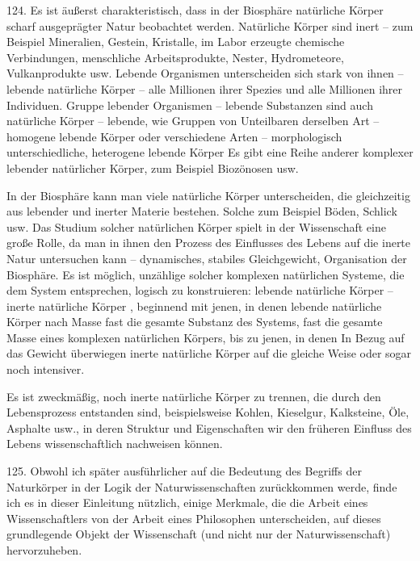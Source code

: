 \documentclass[11pt,a4paper]{book}
\begin{document}
124. Es ist äußerst charakteristisch, dass in der Biosphäre natürliche Körper scharf ausgeprägter Natur beobachtet werden. Natürliche Körper sind inert -- zum Beispiel Mineralien, Gestein, Kristalle, im Labor erzeugte chemische Verbindungen, menschliche Arbeitsprodukte, Nester, Hydrometeore, Vulkanprodukte usw. Lebende Organismen unterscheiden sich stark von ihnen -- lebende natürliche Körper -- alle Millionen ihrer Spezies und alle Millionen ihrer Individuen. Gruppe lebender Organismen -- lebende Substanzen sind auch natürliche Körper -- lebende, wie Gruppen von Unteilbaren derselben Art -- homogene lebende Körper oder verschiedene Arten -- morphologisch unterschiedliche, heterogene lebende Körper Es gibt eine Reihe anderer komplexer lebender natürlicher Körper, zum Beispiel Biozönosen usw.



In der Biosphäre kann man viele natürliche Körper unterscheiden, die gleichzeitig aus lebender und inerter Materie bestehen. Solche zum Beispiel Böden, Schlick usw. Das Studium solcher natürlichen Körper spielt in der Wissenschaft eine große Rolle, da man in ihnen den Prozess des Einflusses des Lebens auf die inerte Natur untersuchen kann -- dynamisches, stabiles Gleichgewicht, Organisation der Biosphäre. Es ist möglich, unzählige solcher komplexen natürlichen Systeme, die dem System entsprechen, logisch zu konstruieren: lebende natürliche Körper -- inerte natürliche Körper , beginnend mit jenen, in denen lebende natürliche Körper nach Masse fast die gesamte Substanz des Systems, fast die gesamte Masse eines komplexen natürlichen Körpers, bis zu jenen, in denen In Bezug auf das Gewicht überwiegen inerte natürliche Körper auf die gleiche Weise oder sogar noch intensiver.



Es ist zweckmäßig, noch inerte natürliche Körper zu trennen, die durch den Lebensprozess entstanden sind, beispielsweise Kohlen, Kieselgur, Kalksteine, Öle, Asphalte usw., in deren Struktur und Eigenschaften wir den früheren Einfluss des Lebens wissenschaftlich nachweisen können.



125. Obwohl ich später ausführlicher auf die Bedeutung des Begriffs der Naturkörper in der Logik der Naturwissenschaften zurückkommen werde, finde ich es in dieser Einleitung nützlich, einige Merkmale, die die Arbeit eines Wissenschaftlers von der Arbeit eines Philosophen unterscheiden, auf dieses grundlegende Objekt der Wissenschaft (und nicht nur der Naturwissenschaft) hervorzuheben.
\end{document}
